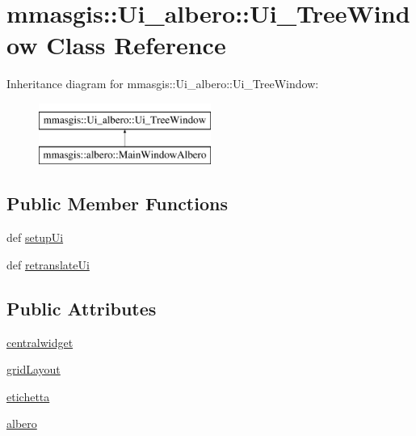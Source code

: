 \hypertarget{classmmasgis_1_1Ui__albero_1_1Ui__TreeWindow}{
\section{mmasgis::Ui\_\-albero::Ui\_\-TreeWindow Class Reference}
\label{classmmasgis_1_1Ui__albero_1_1Ui__TreeWindow}
}
Inheritance diagram for mmasgis::Ui\_\-albero::Ui\_\-TreeWindow:\begin{figure}[H]
\begin{center}
\leavevmode
\includegraphics[height=2.000000cm]{classmmasgis_1_1Ui__albero_1_1Ui__TreeWindow}
\end{center}
\end{figure}
\subsection*{Public Member Functions}
\begin{DoxyCompactItemize}
\item 
def \hyperlink{classmmasgis_1_1Ui__albero_1_1Ui__TreeWindow_a87352cf138dd6d7d99828ea6309313e3}{setupUi}
\item 
def \hyperlink{classmmasgis_1_1Ui__albero_1_1Ui__TreeWindow_a3a7c5b8081004f39b502c85abb4e2ea2}{retranslateUi}
\end{DoxyCompactItemize}
\subsection*{Public Attributes}
\begin{DoxyCompactItemize}
\item 
\hyperlink{classmmasgis_1_1Ui__albero_1_1Ui__TreeWindow_a4571c901c79dbfcf6f3d981b69ff14ff}{centralwidget}
\item 
\hyperlink{classmmasgis_1_1Ui__albero_1_1Ui__TreeWindow_aa9238e7a766f4ebc5e732c2210d59c54}{gridLayout}
\item 
\hyperlink{classmmasgis_1_1Ui__albero_1_1Ui__TreeWindow_ad657dead6d534452d3a3501b04cb02a2}{etichetta}
\item 
\hyperlink{classmmasgis_1_1Ui__albero_1_1Ui__TreeWindow_a1c56d2de7af14bc2bd5fd4f54fa2c9a5}{albero}
\end{DoxyCompactItemize}


